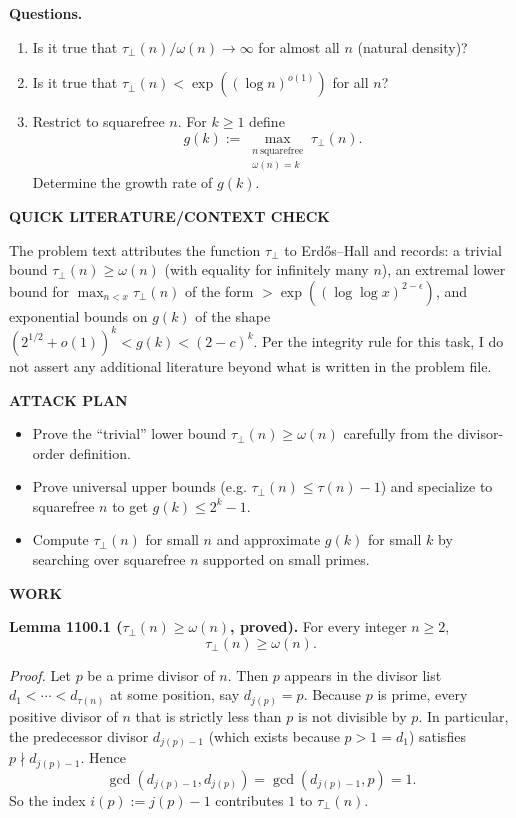 \smallskip
\noindent
\textbf{Questions.}
\begin{enumerate}
\item Is it true that $\tau_\perp(n)/\omega(n)\to\infty$ for almost all $n$ (natural density)?
\item Is it true that $\tau_\perp(n)<\exp((\log n)^{o(1)})$ for all $n$?
\item Restrict to squarefree $n$. For $k\ge 1$ define
\[
 g(k):=\max_{\substack{n\ \text{squarefree}\\ \omega(n)=k}} \tau_\perp(n).
\]
Determine the growth rate of $g(k)$.
\end{enumerate}

\medskip
\noindent\textbf{QUICK LITERATURE/CONTEXT CHECK}

\smallskip
\noindent
The problem text attributes the function $\tau_\perp$ to Erd\H{o}s--Hall and records: a trivial bound $\tau_\perp(n)\ge \omega(n)$ (with equality for infinitely many $n$), an extremal lower bound for $\max_{n<x}\tau_\perp(n)$ of the form $>\exp((\log\log x)^{2-\epsilon})$, and exponential bounds on $g(k)$ of the shape $(2^{1/2}+o(1))^k<g(k)<(2-c)^k$. Per the integrity rule for this task, I do not assert any additional literature beyond what is written in the problem file.

\medskip
\noindent\textbf{ATTACK PLAN}

\smallskip
\noindent
\begin{itemize}
\item Prove the ``trivial'' lower bound $\tau_\perp(n)\ge \omega(n)$ carefully from the divisor-order definition.
\item Prove universal upper bounds (e.g. $\tau_\perp(n)\le \tau(n)-1$) and specialize to squarefree $n$ to get $g(k)\le 2^k-1$.
\item Compute $\tau_\perp(n)$ for small $n$ and approximate $g(k)$ for small $k$ by searching over squarefree $n$ supported on small primes.
\end{itemize}

\medskip
\noindent\textbf{WORK}

\smallskip
\noindent\textbf{Lemma 1100.1 ($\tau_\perp(n)\ge \omega(n)$, proved).}
For every integer $n\ge 2$,
\[
\tau_\perp(n)\ge \omega(n).
\]

\smallskip
\noindent\emph{Proof.}
Let $p$ be a prime divisor of $n$. Then $p$ appears in the divisor list $d_1<\cdots<d_{\tau(n)}$ at some position, say $d_{j(p)}=p$.
Because $p$ is prime, every positive divisor of $n$ that is strictly less than $p$ is not divisible by $p$. In particular, the predecessor divisor $d_{j(p)-1}$ (which exists because $p>1=d_1$) satisfies $p\nmid d_{j(p)-1}$. Hence
\[
\gcd(d_{j(p)-1},d_{j(p)})=\gcd(d_{j(p)-1},p)=1.
\]
So the index $i(p):=j(p)-1$ contributes $1$ to $\tau_\perp(n)$.

